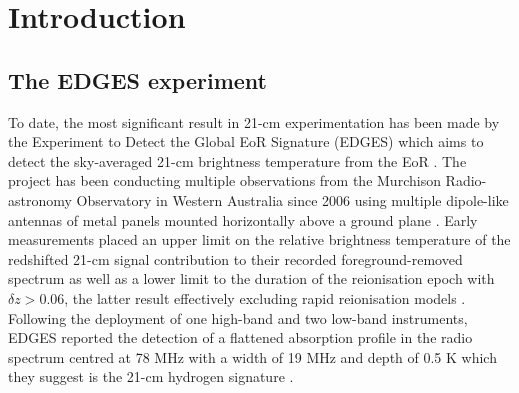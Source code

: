 
\chapter{Introduction}

\ifpdf
    \graphicspath{{introduction/figs/Raster/}{introduction/figs/PDF/}{introduction/figs/}}
\else
    \graphicspath{{introduction/figs/Vector/}{introduction/figs/}}
\fi





\section{The EDGES experiment}\label{sec:edges}
To date, the most significant result in 21-cm experimentation has been made by the Experiment to Detect the Global EoR Signature (EDGES) which aims to detect the sky-averaged 21-cm brightness temperature from the EoR \citep{edgesCal}. The project has been conducting multiple observations from the Murchison Radio-astronomy Observatory in Western Australia since 2006 \citep{edgesCal} using multiple dipole-like antennas of metal panels mounted horizontally above a ground plane \citep{edgesNature}. Early measurements placed an upper limit on the relative brightness temperature of the redshifted 21-cm signal contribution to their recorded foreground-removed spectrum \citep{edges2008} as well as a lower limit to the duration of the reionisation epoch with $\delta z > 0.06$, the latter result effectively excluding rapid reionisation models \citep{edges2010}. Following the deployment of one high-band and two low-band instruments, EDGES reported the detection of a flattened absorption profile in the radio spectrum centred at 78 MHz with a width of 19 MHz and depth of 0.5 K which they suggest is the 21-cm hydrogen signature \citep{edgesNature}.

